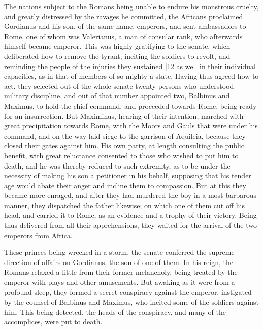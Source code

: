 The nations subject to the Romans being unable to endure his monstrous cruelty, and greatly distressed by the ravages he committed, the Africans proclaimed Gordianus and his son, of the same name, emperors, and sent ambassadors to Rome, one of whom was Valerianus, a man of consular rank, who afterwards himself became emperor. This was highly gratifying to the senate, which deliberated how to remove the tyrant, inciting the soldiers to revolt, and reminding the people of the injuries they sustained
|12 as well in their individual capacities, as in that of members of so mighty a state. Having thus agreed how to act, they selected out of the whole senate twenty persons who understood military discipline, and out of that number appointed two, Balbinus and Maximus, to hold the chief command, and proceeded towards Rome, being ready for an insurrection. But Maximinus, hearing of their intention, marched with great precipitation towards Rome, with the Moors and Gauls that were under his command, and on the way laid siege to the garrison of Aquileia, because they closed their gates against him. His own party, at length consulting the public benefit, with great reluctance consented to those who wished to put him to death, and he was thereby reduced to such extremity, as to be under the necessity of making his son a petitioner in his behalf, supposing that his tender age would abate their anger and incline them to compassion. But at this they became more enraged, and after they had murdered the boy in a most barbarous manner, they dispatched the father likewise; on which one of them cut off his head, and carried it to Rome, as an evidence and a trophy of their victory. Being thus delivered from all their apprehensions, they waited for the arrival of the two emperors from Africa.

These princes being wrecked in a storm, the senate conferred the supreme direction of affairs on Gordianus, the son of one of them. In his reign, the Romans relaxed a little from their former melancholy, being treated by the emperor with plays and other amusements. But awaking as it were from a profound sleep, they formed a secret conspiracy against the emperor, instigated by the counsel of Balbinus and Maximus, who incited some of the soldiers against him. This being detected, the heads of the conspiracy, and many of the accomplices, were put to death.

